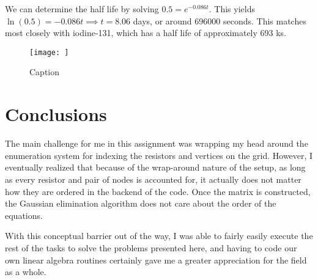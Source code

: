 \documentclass{article}
\begin{document}
We can determine the half life by solving $\displaystyle 0.5 = e^{-0.086t}$. This yields $\ln(0.5)=-0.086t \implies t = 8.06$ days, or around 696000 seconds. This matches most closely with iodine-131, which has a half life of approximately 693 ks.

\begin{figure}[H]
    \centering
    \texttt{[image: ]}
    \caption{Caption}
    \label{fig:decay}
\end{figure}

\section{Conclusions}

The main challenge for me in this assignment was wrapping my head around the enumeration system for indexing the resistors and vertices on the grid. However, I eventually realized that because of the wrap-around nature of the setup, as long as every resistor and pair of nodes is accounted for, it actually does not matter how they are ordered in the backend of the code. Once the matrix is constructed, the Gaussian elimination algorithm does not care about the order of the equations.

With this conceptual barrier out of the way, I was able to fairly easily execute the rest of the tasks to solve the problems presented here, and having to code our own linear algebra routines certainly gave me a greater appreciation for the field as a whole.
\end{document}
